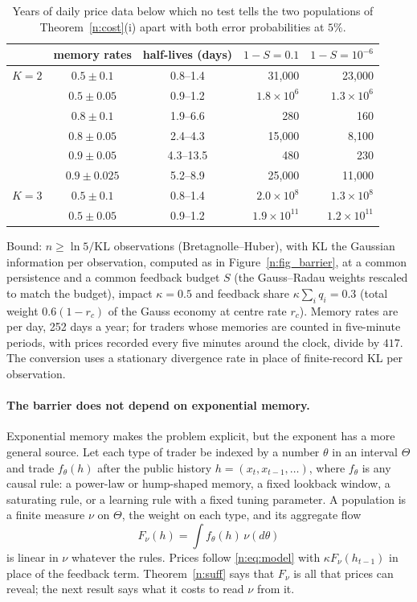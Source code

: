 \documentclass[12pt]{article}
\theoremstyle{definition}
\theoremstyle{remark}
\begin{document}
\begin{table}[t]
\centering
\caption{Years of daily price data below which no test tells the two populations of Theorem~\ref{n:cost}(i) apart with both error probabilities at $5\%$.}
\label{n:tab_cal}
\begin{tabular}{cccrr}
\toprule
& memory rates & half-lives (days) & $1-S=0.1$ & $1-S=10^{-6}$\\
\midrule
$K=2$ & $0.5\pm0.1$ & 0.8--1.4 & 31{,}000 & 23{,}000\\
 & $0.5\pm0.05$ & 0.9--1.2 & $1.8\times10^{6}$ & $1.3\times10^{6}$\\
 & $0.8\pm0.1$ & 1.9--6.6 & 280 & 160\\
 & $0.8\pm0.05$ & 2.4--4.3 & 15{,}000 & 8{,}100\\
 & $0.9\pm0.05$ & 4.3--13.5 & 480 & 230\\
 & $0.9\pm0.025$ & 5.2--8.9 & 25{,}000 & 11{,}000\\
\midrule
$K=3$ & $0.5\pm0.1$ & 0.8--1.4 & $2.0\times10^{8}$ & $1.3\times10^{8}$\\
 & $0.5\pm0.05$ & 0.9--1.2 & $1.9\times10^{11}$ & $1.2\times10^{11}$\\
\bottomrule
\end{tabular}
\par\smallskip
\parbox{\textwidth}{\footnotesize Bound: $n\ge\ln 5/\mathrm{KL}$ observations (Bretagnolle--Huber), with KL the Gaussian information per observation, computed as in Figure~\ref{n:fig_barrier}, at a common persistence and a common feedback budget $S$ (the Gauss--Radau weights rescaled to match the budget), impact $\kappa=0.5$ and feedback share $\kappa\sum_iq_i=0.3$ (total weight $0.6(1-r_c)$ of the Gauss economy at centre rate $r_c$). Memory rates are per day, 252 days a year; for traders whose memories are counted in five-minute periods, with prices recorded every five minutes around the clock, divide by $417$. The conversion uses a stationary divergence rate in place of finite-record KL per observation.}
\end{table}

\paragraph{The barrier does not depend on exponential memory.} Exponential memory makes the problem explicit, but the exponent has a more general source. Let each type of trader be indexed by a number $\theta$ in an interval $\Theta$ and trade $f_\theta(h)$ after the public history $h=(x_t,x_{t-1},\ldots)$, where $f_\theta$ is any causal rule: a power-law or hump-shaped memory, a fixed lookback window, a saturating rule, or a learning rule with a fixed tuning parameter. A population is a finite measure $\nu$ on $\Theta$, the weight on each type, and its aggregate flow
\[
F_\nu(h)=\int f_\theta(h)\,\nu(d\theta)
\]
is linear in $\nu$ whatever the rules. Prices follow \eqref{n:eq:model} with $\kappa F_\nu(h_{t-1})$ in place of the feedback term. Theorem~\ref{n:suff} says that $F_\nu$ is all that prices can reveal; the next result says what it costs to read $\nu$ from it.
\end{document}
